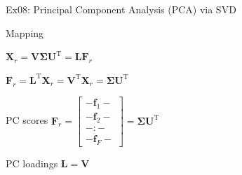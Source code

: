 \documentclass[mathserif, aspectratio=1610]{intbeamer}
\begin{document}
\begin{frame}[t]{Ex08: Principal Component Analysis (PCA) via SVD}
\begin{minipage}[t]{0.49\textwidth}
Mapping

$\bm{X}_r = \bm{V} \bm{\Sigma} \bm{U}^\mathrm{T} = \bm{L} \bm{F}_r$

$\bm{F}_r = \bm{L}^\mathrm{T} \bm{X}_r = \bm{V}^\mathrm{T} \bm{X}_r = \bm{\Sigma} \bm{U}^\mathrm{T}$

PC scores $\bm{F}_r =
\begin{bmatrix}
- \bm{f}_1 -\\
- \bm{f}_2 -\\
- : -\\
- \bm{f}_F -
\end{bmatrix}
=
\bm{\Sigma} \bm{U}^\mathrm{T}$

PC loadings $\bm{L} = \bm{V} $



\end{minipage}

\end{frame}
\end{document}
